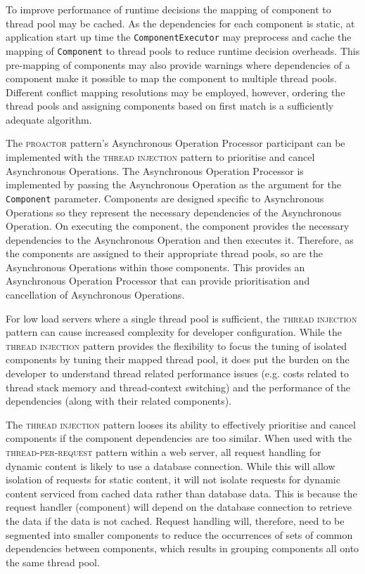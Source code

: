\documentclass[prodmode]{style/acmlarge}
\begin{document}
To improve performance of runtime decisions the mapping of component to thread
pool may be cached.  As the dependencies for each component is static, at
application start up time the \texttt{ComponentExecutor} may preprocess and
cache the mapping of \texttt{Component} to thread pools to reduce runtime
decision overheads.  This pre-mapping of components may also provide warnings
where dependencies of a component make it possible to map the component to
multiple thread pools.  Different conflict mapping resolutions may be employed,
however, ordering the thread pools and assigning components based on first match
is a sufficiently adequate algorithm.

The \textsc{proactor} pattern's Asynchronous Operation Processor participant can
be implemented with the \textsc{thread injection} pattern to prioritise and cancel
Asynchronous Operations.  The Asynchronous Operation Processor is implemented by
passing the Asynchronous Operation as the argument for the \texttt{Component}
parameter.  Components are designed specific to Asynchronous Operations so they
represent the necessary dependencies of the Asynchronous Operation.  On
executing the component, the component provides the necessary dependencies to
the Asynchronous Operation and then executes it.  Therefore, as the components
are assigned to their appropriate thread pools, so are the Asynchronous
Operations within those components.  This provides an Asynchronous Operation
Processor that can provide prioritisation and cancellation of Asynchronous
Operations.

For low load servers where a single thread pool is sufficient, the
\textsc{thread injection} pattern can cause increased complexity for developer
configuration.  While the \textsc{thread injection} pattern provides the
flexibility to focus the tuning of isolated components by tuning their mapped
thread pool, it does put the burden on the developer to understand thread
related performance issues (e.g. costs related to thread stack memory and
thread-context switching) and the performance of the dependencies (along with
their related components).

The \textsc{thread injection} pattern looses its ability to effectively
prioritise and cancel components if the component dependencies are too similar. 
When used with the \textsc{thread-per-request} pattern within a web server, all
request handling for dynamic content is likely to use a database connection. 
While this will allow isolation of requests for static content, it will not
isolate requests for dynamic content serviced from cached data rather than
database data.  This is because the request handler (component) will depend on
the database connection to retrieve the data if the data is not cached.  Request
handling will, therefore, need to be segmented into smaller components to reduce
the occurrences of sets of common dependencies between components, which results
in grouping components all onto the same thread pool.
\end{document}
